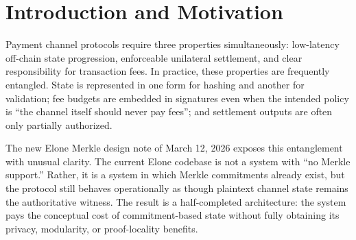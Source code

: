 \documentclass[11pt,a4paper]{article}
\begin{document}
\begin{abstract}
\textbf{Formal Consequences:} We show that partition conservation implies zero channel-paid fees and that deterministic settlement descriptors yield a unique unilateral settlement output set, up to canonical serialization. Under an explicit simple-proof model, we also show that proof-first verification is naturally local in the touched state footprint and that a bare state root is insufficient for unilateral recovery. These results replace fee-cap reasoning with a stronger invariant over value partitions and replace plaintext-authoritative recovery with a sharper notion of recoverable protocol meaning.

\textbf{Paper Type:} This draft should be read as a March 2026 protocol-design paper derived from the new Elone Merkle design memorandum. It is not a claim that the full design is already implemented, nor does it yet claim systems-level empirical closure. Rather, it provides a formalized architectural specification and migration discipline for upgrading Elone from a plaintext-assisted channel protocol to a proof-first, merkleized channel architecture.

\textbf{Keywords:} Payment Channels, Merkleized Channels, Partition Conservation, Proof-First Witnesses, Deterministic Settlement, Elone Protocol
\end{abstract}

\newpage
\tableofcontents
\newpage

\section{Introduction and Motivation}

Payment channel protocols require three properties simultaneously: low-latency off-chain state progression, enforceable unilateral settlement, and clear responsibility for transaction fees. In practice, these properties are frequently entangled. State is represented in one form for hashing and another for validation; fee budgets are embedded in signatures even when the intended policy is ``the channel itself should never pay fees''; and settlement outputs are often only partially authorized.

The new Elone Merkle design note of March 12, 2026 exposes this entanglement with unusual clarity. The current Elone codebase is not a system with ``no Merkle support.'' Rather, it is a system in which Merkle commitments already exist, but the protocol still behaves operationally as though plaintext channel state remains the authoritative witness. The result is a half-completed architecture: the system pays the conceptual cost of commitment-based state without fully obtaining its privacy, modularity, or proof-locality benefits.
\end{document}
